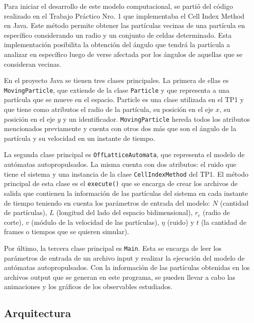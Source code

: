 \documentclass[11pt]{article}
\begin{document}
    Para iniciar el desarrollo de este modelo computacional, se partió del código realizado en el Trabajo Práctico Nro. 1 que
    implementaba el Cell Index Method en Java. Este método permite obtener las partículas vecinas de una partícula en específico
    considerando un radio y un conjunto de celdas determinado. Esta implementación posibilita la obtención del ángulo que tendrá
    la partícula a analizar en específico luego de verse afectada por los ángulos de aquellas que se consideran vecinas.

    En el proyecto Java se tienen tres clases principales. La primera de ellas es \texttt{MovingParticle}, que extiende de
    la clase \texttt{Particle} y que representa a una partícula que se mueve en el espacio. Particle es una clase utilizada en el
    TP1 y que tiene como atributos el radio de la partícula, su posición en el eje $x$, su posición en el eje $y$ y un
    identificador. \texttt{MovingParticle} hereda todos los atributos mencionados previamente y cuenta con otros dos más que son
    el ángulo de la partícula y su velocidad en un instante de tiempo.

    La segunda clase principal es \texttt{OffLatticeAutomata}, que representa el modelo de autómatas autopropulsados. La misma cuenta
    con dos atributos: el ruido que tiene el sistema y una instancia de la clase \texttt{CellIndexMethod} del TP1. El método principal de esta clase
    es el \texttt{execute()} que se encarga de crear los archivos de salida que contienen la información de las partículas del sistema
    en cada instante de tiempo teniendo en cuenta los parámetros de entrada del modelo: $N$ (cantidad de partículas), $L$ (longitud
    del lado del espacio bidimensional), $r_c$ (radio de corte), $v$ (módulo de la velocidad de las partículas), $\eta$ (ruido) y
    $t$ (la cantidad de frames o tiempos que se quieren simular).

    Por último, la tercera clase principal es \texttt{Main}. Esta se encarga de leer los parámetros de entrada de un archivo input y
    realizar la ejecución del modelo de autómatas autopropulsados. Con la información de las partículas obtenidas en los archivos
    output que se generan en este programa, se pueden llevar a cabo las animaciones y los gráficos de los observables estudiados.

        \subsection{Arquitectura}
\end{document}

